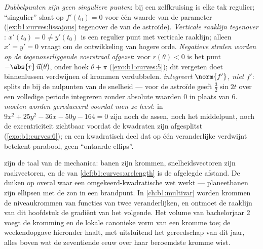 \begin{remark}
\label{rem:b1:curves:pitfalls}
\emph{Dubbelpunten zijn geen singuliere punten}: bij een
zelfkruising is elke tak regulier; ``singulier'' slaat op $f'(t_0)
= 0$ voor één waarde van de parameter
(\cref{ex:b1:curves:lissajous} tegenover de  van de
astroïde).
\emph{Verticale raaklijn tegenover }: $x'(t_0) = 0 \neq
y'(t_0)$ is een regulier punt met verticale raaklijn; alleen $x' =
y' = 0$ vraagt om de ontwikkeling van hogere orde.
\emph{Negatieve stralen worden op de tegenoverliggende voerstraal
afgezet}: voor $r(\theta) < 0$ is het punt $-\abs{r}\,\vec
u(\theta)$, onder hoek $\theta + \pi$ (\cref{exo:b1:curves:5}); dit
vergeten doet binnenlussen verdwijnen of krommen verdubbelen.
\emph{ integreert $\norm{f'}$, niet $f'$}: splits de
 bij de nulpunten van de snelheid --- voor de astroïde
geeft $\frac32\sin 2t$ over een volledige periode integreren zonder
absolute waarden $0$ in plaats van $6$.
\emph{ moeten worden gereduceerd voordat men ze leest}:
in $9x^2 + 25y^2 - 36x - 50y - 164 = 0$ zijn noch de assen, noch
het middelpunt, noch de excentriciteit zichtbaar voordat de
kwadraten zijn afgesplitst (\cref{exo:b1:curves:6}); en een
kwadratisch deel dat op één veranderlijke verdwijnt betekent
parabool, geen ``ontaarde ellips''.
\end{remark}

\begin{remark}
\label{rem:b1:curves:whereused}
 zijn de taal van de mechanica: banen zijn
krommen, snelheidsvectoren zijn raakvectoren, en de  van
\cref{def:b1:curves:arclength} is de afgelegde afstand. De
 duiken op overal waar een omgekeerd-kwadratische wet
werkt --- planeetbanen zijn ellipsen met de zon in een brandpunt.
In \cref{ch:b1:multivar} worden krommen de niveaukrommen van
functies van twee veranderlijken, en ontmoet de raaklijn van dit
hoofdstuk de gradiënt van het volgende. Het volume van
bachelorjaar 2 voegt de kromming en de lokale canonieke vorm van
een kromme toe; de weekendopgave hieronder haalt, met uitsluitend
het gereedschap van dit jaar, alles boven wat de zeventiende eeuw
over haar beroemdste kromme wist.
\end{remark}


